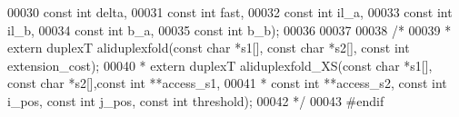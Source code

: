 \begin{DoxyCode}
00030                             \textcolor{keyword}{const} \textcolor{keywordtype}{int}   delta,
00031                             \textcolor{keyword}{const} \textcolor{keywordtype}{int}   fast,
00032                             \textcolor{keyword}{const} \textcolor{keywordtype}{int}   il\_a,
00033                             \textcolor{keyword}{const} \textcolor{keywordtype}{int}   il\_b,
00034                             \textcolor{keyword}{const} \textcolor{keywordtype}{int}   b\_a,
00035                             \textcolor{keyword}{const} \textcolor{keywordtype}{int}   b\_b);
00036 
00037 
00038 \textcolor{comment}{/*}
00039 \textcolor{comment}{ * extern duplexT aliduplexfold(const char *s1[], const char *s2[], const int extension\_cost);}
00040 \textcolor{comment}{ * extern duplexT aliduplexfold\_XS(const char *s1[], const char *s2[],const int **access\_s1,}
00041 \textcolor{comment}{ * const int **access\_s2, const int i\_pos, const int j\_pos, const int threshold);}
00042 \textcolor{comment}{ */}
00043 \textcolor{preprocessor}{#endif}
\end{DoxyCode}
